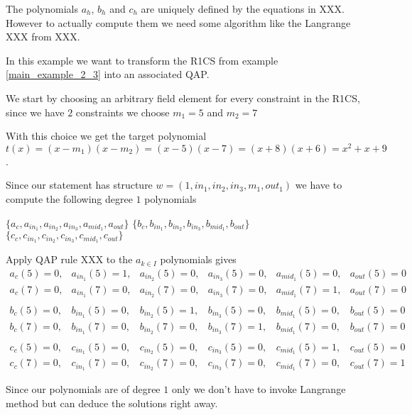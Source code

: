 The polynomials $a_h$, $b_h$ and $c_h$ are uniquely defined by the equations in XXX. However to actually compute them we need some algorithm like the Langrange XXX from XXX.

\begin{example}
In this example we want to transform the R1CS from example \ref{main_example_2_3} into an associated QAP.

We start by choosing an arbitrary field element for every constraint in the R1CS, since we have $2$ constraints we choose $m_{1}=5$ and $m_{2}=7$

With this choice we get the target polynomial $t(x)=(x-m_1)(x-m_2)= (x-5)(x-7)= (x+8)(x+6)= x^2 + x +9$.

Since our statement has structure $w=(1, in_1,in_2,in_3,m_1,out_1)$ we have to compute the following degree $1$ polynomials

$\{a_{c},a_{in_{1}},a_{in_{2}},a_{in_{3}},a_{mid_{1}},a_{out}\}$
$\{b_{c},b_{in_{1}},b_{in_{2}},b_{in_{3}},b_{mid_{1}},b_{out}\}$
$\{c_{c},c_{in_{1}},c_{in_{2}},c_{in_{3}},c_{mid_{1}},c_{out}\}$

\item Apply QAP rule XXX to the $a_{k\in I}$ polynomials gives
$$
\begin{array}{llllll}
a_{c}(5)=0, & a_{in_{1}}(5)=1, & a_{in_{2}}(5)=0, & a_{in_{3}}(5)=0, & a_{mid_{1}}(5)=0, & a_{out}(5)=0 \\
a_{c}(7)=0, & a_{in_{1}}(7)=0, & a_{in_{2}}(7)=0, & a_{in_{3}}(7)=0, & a_{mid_{1}}(7)=1, & a_{out}(7)=0\\
\\
b_{c}(5)=0, & b_{in_{1}}(5)=0, & b_{in_{2}}(5)=1, & b_{in_{3}}(5)=0, & b_{mid_{1}}(5)=0, & b_{out}(5)=0 \\
b_{c}(7)=0, & b_{in_{1}}(7)=0, & b_{in_{2}}(7)=0, & b_{in_{3}}(7)=1, & b_{mid_{1}}(7)=0, & b_{out}(7)=0\\
\\
c_{c}(5)=0, & c_{in_{1}}(5)=0, & c_{in_{2}}(5)=0, & c_{in_{3}}(5)=0, & c_{mid_{1}}(5)=1, & c_{out}(5)=0 \\
c_{c}(7)=0, & c_{in_{1}}(7)=0, & c_{in_{2}}(7)=0, & c_{in_{3}}(7)=0, & c_{mid_{1}}(7)=0, & c_{out}(7)=1
\end{array}
$$

Since our polynomials are of degree $1$ only we don't have to invoke Langrange method but can deduce the solutions right away. 


\end{example}
